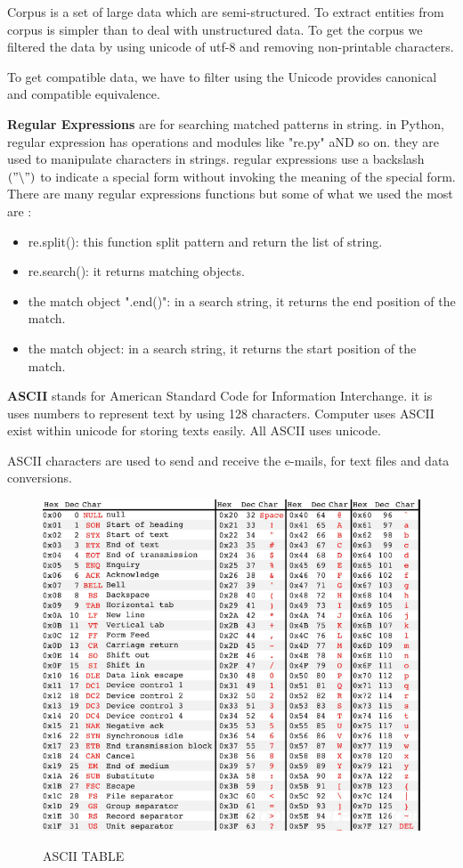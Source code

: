 \begin{itemize}
Corpus is a set of large data which are semi-structured.  To extract entities from corpus is simpler than to deal with unstructured data. To get the corpus we filtered the data by using unicode of utf-8 and removing non-printable characters.

To get compatible data, we have to filter using the Unicode provides canonical and compatible equivalence.


\textbf{Regular Expressions} are for searching matched patterns in string.  
in Python, regular expression has operations and modules like "re.py" aND so on. they are used to manipulate characters in strings. regular expressions use a backslash $(" \backslash  ")$  to indicate a special form without invoking the meaning of the special form. There are many regular expressions functions but some of what we used the most are :
\begin{itemize}
\item re.split(): this function split pattern and return the list of string.
\item re.search(): it returns matching  objects.
\item the match object ".end()": in a search string, it returns the end position of the match.
\item the match object: in a search string, it returns the start position of the match.
\end{itemize}

\textbf{ASCII} stands for American Standard Code for Information Interchange. it is uses numbers to represent text by using 128 characters. Computer uses ASCII exist within unicode for storing texts easily. All  ASCII uses unicode.

ASCII characters are used to send and receive the e-mails, for text files and data conversions. 

\begin{figure}[hbtp]
\caption{ASCII TABLE \citep{witte2002electronic}}
\centering
\includegraphics[scale=.35]{images/ASCII.png}\label{ASCII}
\end{figure}
\end{itemize}

